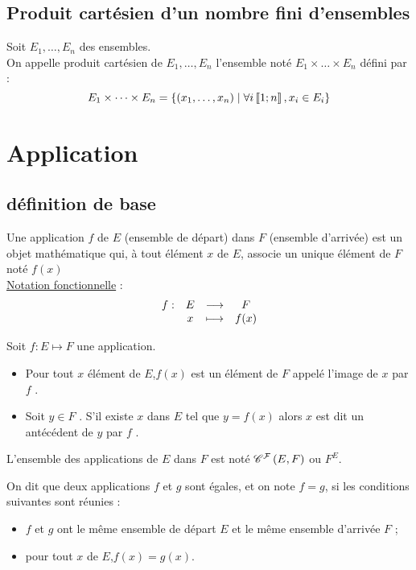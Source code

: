 \subsection{Produit cartésien d’un nombre fini d’ensembles}
\begin{defprop}
    Soit \(E_1, \dots, E_n\) des ensembles.\\
    On appelle produit cartésien de \(E_1, \dots, E_n\) l’ensemble noté \(E_1 \times \dots \times E_n\) défini par :
    \[E_1 \times \dots \times E_n = \left\lbrace\left(x_1,\dots,x_n\right) \;\middle|\; \forall i \left\llbracket1;n\right\rrbracket, x_i \in E_i\right\rbrace \]
\end{defprop}


\section{Application}

\subsection{définition de base}
\begin{defprop}
    Une application \(f\) de \(E\) (ensemble de départ) dans \(F\) (ensemble d’arrivée) est un objet mathématique qui, à tout élément \(x\) de \(E\), associe un unique élément de \(F\) noté \(f (x)\) \\
    \underline{Notation fonctionnelle} : \[\begin{array}[t]{cccc}f : & E & \longrightarrow & F \\ & x & \longmapsto & f(x)\end{array}\]
\end{defprop}


\begin{defprop}
    Soit \(f : E \mapsto F\) une application.
    \begin{itemize}
        \item Pour tout \(x\) élément de \(E\),\( f (x)\) est un élément de \(F\) appelé l’image de \(x\) par \(f\) .
        \item Soit \(y \in F\) . S’il existe \(x\) dans \(E\) tel que \(y = f (x)\) alors \(x\) est dit un antécédent de \(y\) par \(f\) .
    \end{itemize}
\end{defprop}
\begin{defprop}
    L’ensemble des applications de \(E\) dans \(F\) est noté \(\mathscr{C}^{\mathcal{F}}\left(E,F\right)\) ou \(F^E\).
\end{defprop}
\begin{defprop}
    On dit que deux applications \(f\) et \(g\) sont égales, et on note \(f = g\), si les conditions suivantes sont réunies :
    \begin{itemize}
        \item \(f\) et \(g\) ont le même ensemble de départ \(E\) et le même ensemble d’arrivée \(F\) ;
        \item pour tout \(x\) de \(E\),\( f (x) = g(x)\).
    \end{itemize}
\end{defprop}

